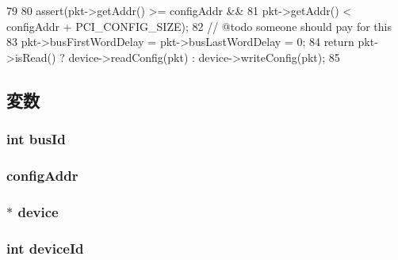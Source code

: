 \begin{DoxyCode}
79 {
80     assert(pkt->getAddr() >= configAddr &&
81            pkt->getAddr() < configAddr + PCI_CONFIG_SIZE);
82     // @todo someone should pay for this
83     pkt->busFirstWordDelay = pkt->busLastWordDelay = 0;
84     return pkt->isRead() ? device->readConfig(pkt) : device->writeConfig(pkt);
85 }
\end{DoxyCode}


\subsection{変数}
\hypertarget{classPciDevice_1_1PciConfigPort_a5071e865d44deeb430a3bce2cb2689a0}{
\subsubsection[{busId}]{\setlength{\rightskip}{0pt plus 5cm}int {\bf busId}}}
\label{classPciDevice_1_1PciConfigPort_a5071e865d44deeb430a3bce2cb2689a0}
\hypertarget{classPciDevice_1_1PciConfigPort_aab0054b91c8a54dc6f07615338b2e78d}{
\subsubsection[{configAddr}]{ {\bf configAddr}}}
\label{classPciDevice_1_1PciConfigPort_aab0054b91c8a54dc6f07615338b2e78d}
\hypertarget{classPciDevice_1_1PciConfigPort_a9f9600bae2078d3e0d11c471e5e34488}{
\subsubsection[{device}]{$\ast$ {\bf device}}}
\label{classPciDevice_1_1PciConfigPort_a9f9600bae2078d3e0d11c471e5e34488}
\hypertarget{classPciDevice_1_1PciConfigPort_ae33571d7242e04fb46496c9852fad407}{
\subsubsection[{deviceId}]{\setlength{\rightskip}{0pt plus 5cm}int {\bf deviceId}}}
